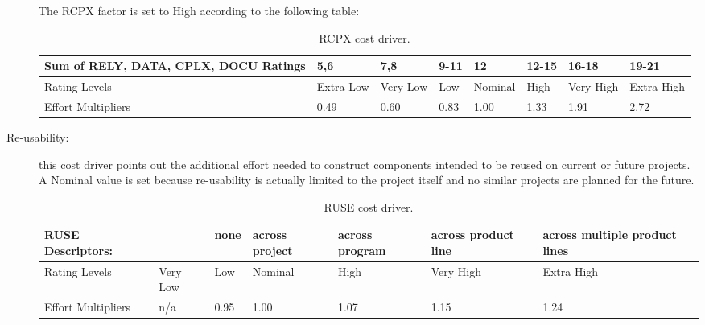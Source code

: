 \begin{description}
The RCPX factor is set to High according to the following table:

\begin{table}[H]
	\begin{adjustwidth}{-.5in}{-.5in}
    \centering
    \begin{tabular}{p{4cm}|p{1cm}|p{1cm}|p{1cm}|p{1.5cm}|p{1cm}|p{1cm}|p{1cm}}
        \hline
        Sum of RELY, DATA, CPLX, DOCU Ratings & 5,6 & 7,8 & 9-11 & 12 & 12-15 & 16-18 & 19-21 \\
        \hline
        \hline
        Rating Levels & Extra Low & Very Low & Low & Nominal & High & Very High & Extra High \\
        \hline
        Effort Multipliers & 0.49 & 0.60 & 0.83 & 1.00 & 1.33 & 1.91 & 2.72 \\
        \hline
    \end{tabular}
    \caption{RCPX cost driver.}
    \end{adjustwidth}
\end{table}

\item[Re-usability:] this cost driver points out the additional effort needed to construct components intended to be reused on current or future projects. A Nominal value is set because re-usability is actually limited to the project itself and no similar projects are planned for the future. 

\begin{table}[H]
	\begin{adjustwidth}{-.5in}{-.5in}
    \centering
    \begin{tabular}{p{3.8cm}|p{1cm}|p{1cm}|p{1.5cm}|p{1.6cm}|p{1.5cm}|p{2cm}}
    	\hline
        RUSE Descriptors: & & none & across project & across program & across product line & across multiple product lines \\
        \hline
        Rating Levels & Very Low & Low & Nominal & High & Very High & Extra High \\
        \hline
        Effort Multipliers & n/a & 0.95 & 1.00 & 1.07 & 1.15 & 1.24 \\
        \hline
    \end{tabular}
    \caption{RUSE cost driver.}
    \end{adjustwidth}
\end{table}


\end{description}
